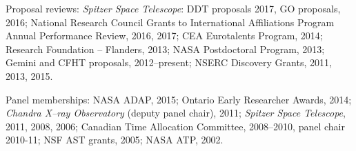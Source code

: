 Proposal reviews:
{\it Spitzer Space Telescope\/}: DDT proposals 2017, GO proposals, 2016;  
National Research Council Grants to International Affiliations Program Annual Performance Review, 2016, 2017;
CEA Eurotalents Program, 2014;
Research Foundation -- Flanders, 2013;
NASA Postdoctoral Program, 2013;
Gemini and CFHT proposals, 2012--present;
NSERC Discovery Grants, 2011, 2013, 2015.
\vspace{0.2cm}

Panel memberships:
NASA ADAP, 2015;
Ontario Early Researcher Awards, 2014;
{\it Chandra X--ray Observatory\/} (deputy panel chair), 2011;
{\it Spitzer Space Telescope\/}, 2011, 2008, 2006;
Canadian Time Allocation Committee, 2008--2010, panel chair 2010-11;
NSF AST grants, 2005;
NASA ATP, 2002.